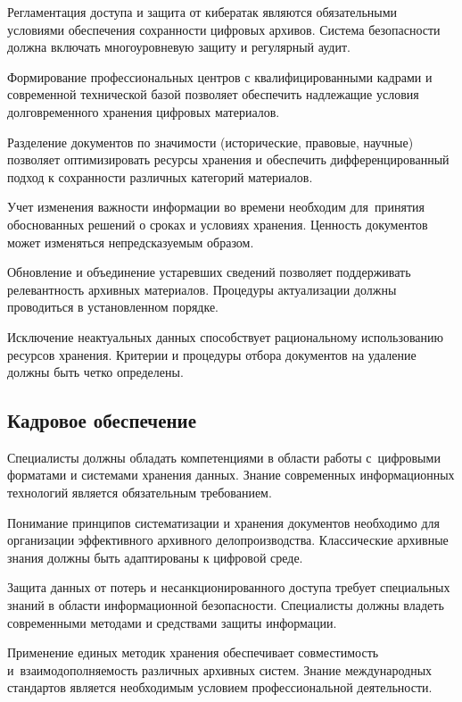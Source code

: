 \documentclass{ou}
\begin{document}
Регламентация доступа и защита от кибератак являются обязательными условиями обеспечения сохранности цифровых архивов. Система безопасности должна включать многоуровневую защиту и регулярный аудит.

Формирование профессиональных центров с квалифицированными кадрами и современной технической базой позволяет обеспечить надлежащие условия долговременного хранения цифровых материалов.

Разделение документов по значимости (исторические, правовые, научные) позволяет оптимизировать ресурсы хранения и обеспечить дифференцированный подход к сохранности различных категорий материалов.

Учет изменения важности информации во времени необходим для~принятия обоснованных решений о сроках и условиях хранения. Ценность документов может изменяться непредсказуемым образом.

Обновление и объединение устаревших сведений позволяет поддерживать релевантность архивных материалов. Процедуры актуализации должны проводиться в установленном порядке.

Исключение неактуальных данных способствует рациональному использованию ресурсов хранения. Критерии и процедуры отбора документов на удаление должны быть четко определены.
\subsection{Кадровое обеспечение}
Специалисты должны обладать компетенциями в области работы с~цифровыми форматами и системами хранения данных. Знание современных информационных технологий является обязательным требованием.

Понимание принципов систематизации и хранения документов необходимо для организации эффективного архивного делопроизводства. Классические архивные знания должны быть адаптированы к цифровой среде.

Защита данных от потерь и несанкционированного доступа требует специальных знаний в области информационной безопасности. Специалисты должны владеть современными методами и средствами защиты информации.

Применение единых методик хранения обеспечивает совместимость и~взаимодополняемость различных архивных систем. Знание международных стандартов является необходимым условием профессиональной деятельности.
\end{document}
